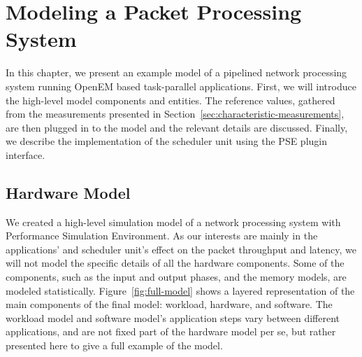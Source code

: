 \chapter{Modeling a Packet Processing System}
\label{chapter:modeling-a-packet-processing-system}

In this chapter, we present an example model of a pipelined network processing system running OpenEM based task-parallel applications. First, we will introduce the high-level model components and entities. The reference values, gathered from the measurements presented in Section~\ref{sec:characteristic-measurements}, are then plugged in to the model and the relevant details are discussed. Finally, we describe the implementation of the scheduler unit using the PSE plugin interface.



\section{Hardware Model}
\label{sec:hardware-model}
We created a high-level simulation model of a network processing system with Performance Simulation Environment. As our interests are mainly in the applications' and scheduler unit's effect on the packet throughput and latency, we will not model the specific details of all the hardware components. Some of the components, such as the input and output phases, and the memory models, are modeled statistically. Figure~\ref{fig:full-model} shows a layered representation of the main components of the final model: workload, hardware, and software. The workload model and software model's application steps vary between different applications, and are not fixed part of the hardware model per se, but rather presented here to give a full example of the model.

